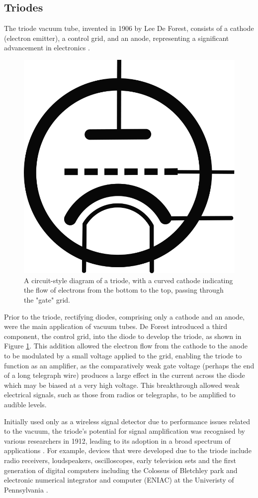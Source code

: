 \begin{refsection}
\subsection{Triodes}
The triode vacuum tube, invented in 1906 by Lee De Forest, consists of a cathode (electron emitter), a control grid, and an anode, representing a significant advancement in electronics \cite{deForest1940}.
\begin{figure}[H]
\centering
\includegraphics[width=0.3\linewidth]{Chapter1/gfx/Triode_symbol.png}
\caption{A circuit-style diagram of a triode, with a curved cathode indicating the flow of electrons from the bottom to the top, passing through the "gate" grid.}
\label{fig:triode_symbol}
\end{figure}
Prior to the triode, rectifying diodes, comprising only a cathode and an anode, were the main application of vacuum tubes. De Forest introduced a third component, the control grid, into the diode to develop the triode, as shown in Figure \ref{fig:triode_symbol}. This addition allowed the electron flow from the cathode to the anode to be modulated by a small voltage applied to the grid, enabling the triode to function as an amplifier, as the comparatively weak gate voltage (perhaps the end of a long telegraph wire) produces a large effect in the current across the diode which may be biased at a very high voltage. This breakthrough allowed weak electrical signals, such as those from radios or telegraphs, to be amplified to audible levels.

Initially used only as a wireless signal detector due to performance issues related to the vacuum, the triode’s potential for signal amplification was recognised by various researchers in 1912, leading to its adoption in a broad spectrum of applications \cite{deForest1940}. For example, devices that were developed due to the triode include radio receivers, loudspeakers, oscilloscopes, early television sets and the first generation of digital computers including the Colossus of Bletchley park \cite{Copeland2004} and electronic numerical integrator and computer (ENIAC) at the Univeristy of Pennsylvania \cite{Goldstine1996}.


\end{refsection}
